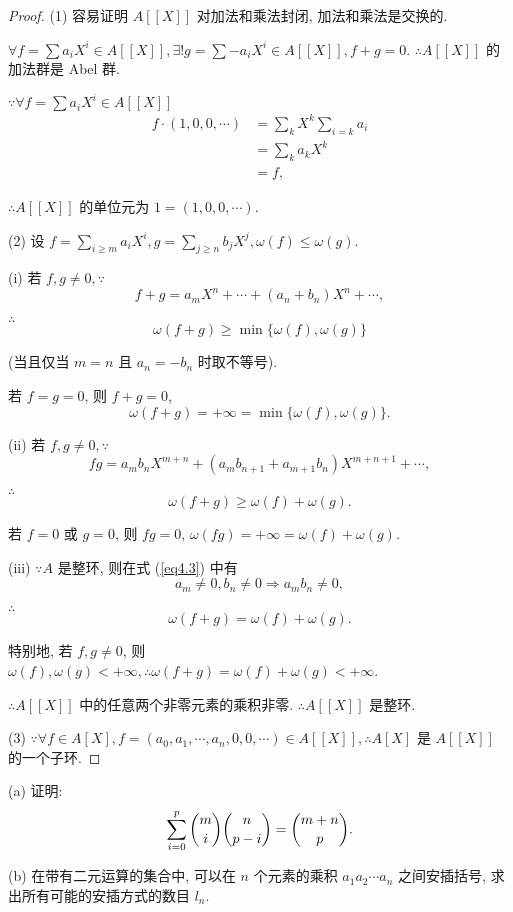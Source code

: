 \documentclass[color=black,device=normal,lang=cn,mode=geye]{elegantnote}
\begin{document}
\begin{proof}
    (1) 容易证明 $A[[X]]$ 对加法和乘法封闭, 加法和乘法是交换的.
    
    $\forall f=\sum a_iX^i\in A[[X]],\exists! g=\sum-a_iX^i\in A[[X]],f+g=0$. $\therefore A[[X]]$ 的加法群是 Abel 群.

    $\because\forall f=\sum a_iX^i\in A[[X]]$
    \begin{align*}
        f\cdot(1,0,0,\cdots) & =\sum\limits_kX^k\sum\limits_{i=k}a_i \\
        & =\sum\limits_ka_kX^k \\
        & =f,
    \end{align*}

    $\therefore A[[X]]$ 的单位元为 $1=(1,0,0,\cdots)$.

    (2) 设 $f=\sum_{i\geq m}a_iX^i,g=\sum_{j\geq n}b_jX^j,\omega(f)\leq\omega(g)$.
    
    (i) 若 $f,g\neq0,\because$
    \[f+g=a_mX^n+\cdots+(a_n+b_n)X^n+\cdots,\]

    $\therefore$
    \[\omega(f+g)\geq\min\{\omega(f),\omega(g)\}\]

    (当且仅当 $m=n$ 且 $a_n=-b_n$ 时取不等号).

    若 $f=g=0$, 则 $f+g=0$,
    \[\omega(f+g)=+\infty=\min\{\omega(f),\omega(g)\}.\]

    (ii) 若 $f,g\neq0,\because$
    \begin{equation}\label{eq4.3}
        fg=a_mb_nX^{m+n}+(a_mb_{n+1}+a_{m+1}b_n)X^{m+n+1}+\cdots,
    \end{equation}

    $\therefore$
    \[\omega(f+g)\geq\omega(f)+\omega(g).\]

    若 $f=0$ 或 $g=0$, 则 $fg=0$, $\omega(fg)=+\infty=\omega(f)+\omega(g)$.

    (iii) $\because A$ 是整环, 则在式 (\ref{eq4.3}) 中有
    \[a_m\neq0,b_n\neq0\Rightarrow a_mb_n\neq0,\]

    $\therefore$
    \[\omega(f+g)=\omega(f)+\omega(g).\]

    特别地, 若 $f,g\neq0$, 则 $\omega(f),\omega(g)<+\infty,\therefore\omega(f+g)=\omega(f)+\omega(g)<+\infty$.

    $\therefore A[[X]]$ 中的任意两个非零元素的乘积非零. $\therefore A[[X]]$ 是整环.

    (3) $\because\forall f\in A[X],f=(a_0,a_1,\cdots,a_n,0,0,\cdots)\in A[[X]],\therefore A[X]$ 是 $A[[X]]$ 的一个子环.
\end{proof}
\begin{exercise}\label{ex2.6}
    (a) 证明:
    \[\sum\limits_{i=0}^p\dbinom{m}{i}\dbinom{n}{p-i}=\dbinom{m+n}{p}.\]

    (b) 在带有二元运算的集合中, 可以在 $n$ 个元素的乘积 $a_1a_2\cdots a_n$ 之间安插括号, 求出所有可能的安插方式的数目 $l_n$.
\end{exercise}
\end{document}
